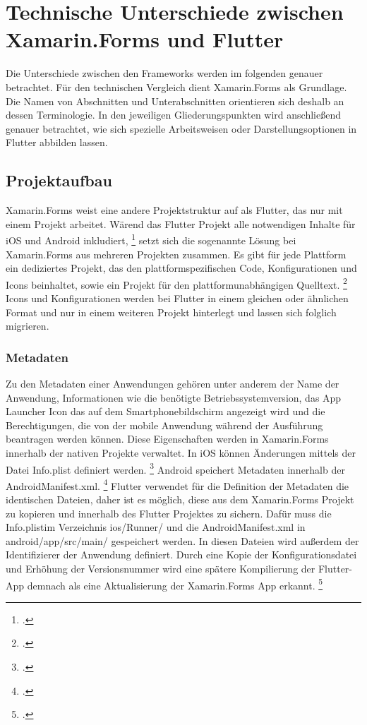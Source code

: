 \chapter{Technische Unterschiede zwischen Xamarin.Forms und Flutter}
\label{chap:CrossPlattformFrameworks}

Die Unterschiede zwischen den Frameworks werden im folgenden genauer betrachtet.  Für den technischen Vergleich dient Xamarin.Forms als Grundlage.  Die Namen von Abschnitten und Unterabschnitten orientieren sich deshalb an dessen Terminologie.  In den jeweiligen Gliederungspunkten wird anschließend genauer betrachtet,  wie sich spezielle Arbeitsweisen oder Darstellungsoptionen in Flutter abbilden lassen. 

\section{Projektaufbau}
Xamarin.Forms weist eine andere Projektstruktur auf als Flutter,  das nur mit einem Projekt arbeitet.  Wärend das Flutter Projekt alle notwendigen Inhalte für iOS und Android inkludiert, \footcite[Vgl.][S. 113]{Biessek2019} setzt sich die sogenannte Lösung bei Xamarin.Forms aus mehreren Projekten zusammen.  Es gibt für jede Plattform ein dediziertes Projekt, das den plattformspezifischen Code,  Konfigurationen und Icons beinhaltet, sowie ein Projekt für den plattformunabhängigen Quelltext.   \footcite[Vgl.][S. 25f.]{Petzold2016} Icons und Konfigurationen werden bei Flutter in einem gleichen oder ähnlichen Format und nur in einem weiteren Projekt hinterlegt und lassen sich folglich migrieren.  


\subsection{Metadaten}
Zu den Metadaten einer Anwendungen gehören unter anderem der Name der Anwendung,  Informationen wie die benötigte Betriebssystemversion, das \glq App Launcher Icon\grq{}  das auf dem Smartphonebildschirm angezeigt wird und die Berechtigungen,  die von der mobile Anwendung während der Ausführung beantragen werden können.  Diese Eigenschaften werden in Xamarin.Forms innerhalb der nativen Projekte verwaltet.  In iOS können Änderungen mittels der Datei \glq Info.plist\grq{} definiert werden. \footcite[Vgl.][Abgerufen am \today]{MicrosoftInfoPlist2017} Android speichert Metadaten innerhalb der \glq AndroidManifest.xml\grq{}. \footcite[Vgl.][Abgerufen am \today]{MicrosoftManifest2018} Flutter verwendet für die Definition der Metadaten die identischen Dateien,  daher ist es möglich,  diese aus dem Xamarin.Forms Projekt zu kopieren und innerhalb des Flutter Projektes zu sichern.  Dafür muss die \glq Info.plist\grq im Verzeichnis \glq ios/Runner/\grq{} und die \glq AndroidManifest.xml\grq{}  in \glq android/app/src/main/\grq{} gespeichert werden.  In diesen Dateien wird außerdem der Identifizierer der Anwendung definiert.  Durch eine Kopie der Konfigurationsdatei und Erhöhung der Versionsnummer wird eine spätere Kompilierung der Flutter-App demnach als eine Aktualisierung der Xamarin.Forms App erkannt.  \footcite[Vgl.][Abgerufen am \today]{Rana2020}



